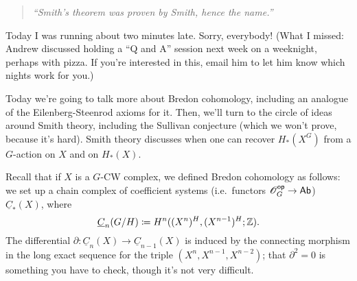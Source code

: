 
\begin{quote}\textit{
	``Smith's theorem was proven by Smith, hence the name.''
}\end{quote}
Today I was running about two minutes late. Sorry, everybody! (What I missed: Andrew discussed holding a ``Q and
A'' session next week on a weeknight, perhaps with pizza. If you're interested in this, email him to let him know
which nights work for you.)

Today we're going to talk more about Bredon cohomology, including an analogue of the Eilenberg-Steenrod axioms for
it. Then, we'll turn to the circle of ideas around Smith theory, including the Sullivan conjecture (which we won't
prove, because it's hard). Smith theory discusses when one can recover $H_*(X^G)$ from a $G$-action on $X$ and on
$H_*(X)$.

Recall that if $X$ is a $G$-CW complex, we defined Bredon cohomology as follows: we set up a chain complex of
coefficient systems (i.e.\ functors $\mathscr O_G^{\mathsf{op}}\to\mathsf{Ab}$) $\underline C_*(X)$, where
\[\underline C_n(G/H)\coloneqq H^n((X^n)^H, (X^{n-1})^H; \mathbb Z).\]
The differential $\partial\colon\underline C_n(X)\to\underline C_{n-1}(X)$ is induced by the connecting morphism in
the long exact sequence for the triple $(X^n, X^{n-1}, X^{n-2})$; that $\partial^2 = 0$ is something you have to
check, though it's not very difficult.

